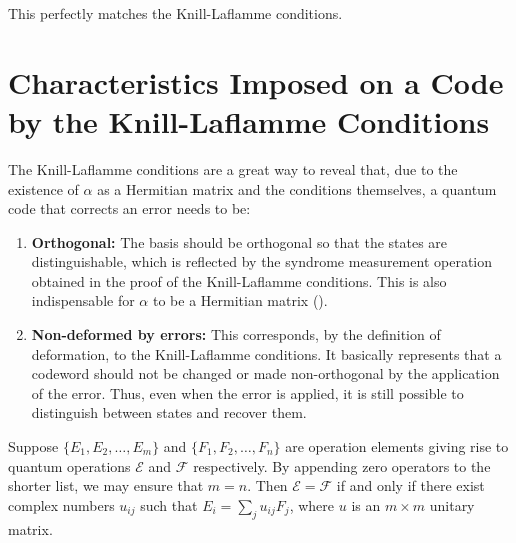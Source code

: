 This perfectly matches the Knill-Laflamme conditions.

\section{Characteristics Imposed on a Code by the Knill-Laflamme Conditions}

The Knill-Laflamme conditions are a great way to reveal that, due to the existence of $\alpha$ as a Hermitian matrix and the conditions themselves, a quantum code that corrects an error needs to be:

\begin{enumerate}
\item \textbf{Orthogonal:} The basis should be orthogonal so that the states are distinguishable, which is reflected by the syndrome measurement operation obtained in the proof of the Knill-Laflamme conditions. This is also indispensable for $\alpha$ to be a Hermitian matrix (\cite{Kitaev2002}).
\item \textbf{Non-deformed by errors:} This corresponds, by the definition of deformation, to the Knill-Laflamme conditions. It basically represents that a codeword should not be changed or made non-orthogonal by the application of the error. Thus, even when the error is applied, it is still possible to distinguish between states and recover them.
\end{enumerate}

\begin{lemma}\label{theorem_8_2}
Suppose $\{E_1, E_2, \ldots, E_m\}$ and $\{F_1, F_2, \ldots, F_n\}$ are operation elements giving rise to quantum operations $\mathcal{E}$ and $\mathcal{F}$ respectively. By appending zero operators to the shorter list, we may ensure that $m = n$. Then $\mathcal{E} = \mathcal{F}$ if and only if there exist complex numbers $u_{ij}$ such that $E_i = \sum_{j} u_{ij} F_j$, where $u$ is an $m \times m$ unitary matrix.
\end{lemma}
